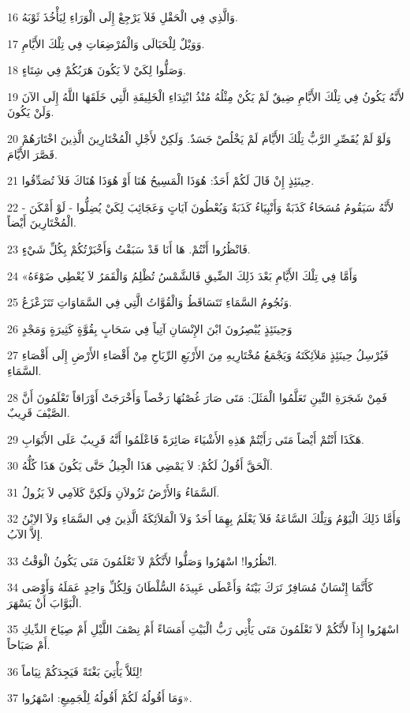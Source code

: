 \par 16 وَالَّذِي فِي الْحَقْلِ فَلاَ يَرْجِعْ إِلَى الْوَرَاءِ لِيَأْخُذَ ثَوْبَهُ.
\par 17 وَوَيْلٌ لِلْحَبَالَى وَالْمُرْضِعَاتِ فِي تِلْكَ الأَيَّامِ.
\par 18 وَصَلُّوا لِكَيْ لاَ يَكُونَ هَرَبُكُمْ فِي شِتَاءٍ.
\par 19 لأَنَّهُ يَكُونُ فِي تِلْكَ الأَيَّامِ ضِيقٌ لَمْ يَكُنْ مِثْلُهُ مُنْذُ ابْتِدَاءِ الْخَلِيقَةِ الَّتِي خَلَقَهَا اللَّهُ إِلَى الآنَ وَلَنْ يَكُونَ.
\par 20 وَلَوْ لَمْ يُقَصِّرِ الرَّبُّ تِلْكَ الأَيَّامَ لَمْ يَخْلُصْ جَسَدٌ. وَلَكِنْ لأَجْلِ الْمُخْتَارِينَ الَّذِينَ اخْتَارَهُمْ قَصَّرَ الأَيَّامَ.
\par 21 حِينَئِذٍ إِنْ قَالَ لَكُمْ أَحَدٌ: هُوَذَا الْمَسِيحُ هُنَا أَوْ هُوَذَا هُنَاكَ فَلاَ تُصَدِّقُوا.
\par 22 لأَنَّهُ سَيَقُومُ مُسَحَاءُ كَذَبَةٌ وَأَنْبِيَاءُ كَذَبَةٌ وَيُعْطُونَ آيَاتٍ وَعَجَائِبَ لِكَيْ يُضِلُّوا - لَوْ أَمْكَنَ - الْمُخْتَارِينَ أَيْضاً.
\par 23 فَانْظُرُوا أَنْتُمْ. هَا أَنَا قَدْ سَبَقْتُ وَأَخْبَرْتُكُمْ بِكُلِّ شَيْءٍ.
\par 24 «وَأَمَّا فِي تِلْكَ الأَيَّامِ بَعْدَ ذَلِكَ الضِّيقِ فَالشَّمْسُ تُظْلِمُ وَالْقَمَرُ لاَ يُعْطِي ضَوْءَهُ
\par 25 وَنُجُومُ السَّمَاءِ تَتَسَاقَطُ وَالْقُوَّاتُ الَّتِي فِي السَّمَاوَاتِ تَتَزَعْزَعُ.
\par 26 وَحِينَئِذٍ يُبْصِرُونَ ابْنَ الإِنْسَانِ آتِياً فِي سَحَابٍ بِقُوَّةٍ كَثِيرَةٍ وَمَجْدٍ
\par 27 فَيُرْسِلُ حِينَئِذٍ مَلاَئِكَتَهُ وَيَجْمَعُ مُخْتَارِيهِ مِنَ الأَرْبَعِ الرِّيَاحِ مِنْ أَقْصَاءِ الأَرْضِ إِلَى أَقْصَاءِ السَّمَاءِ.
\par 28 فَمِنْ شَجَرَةِ التِّينِ تَعَلَّمُوا الْمَثَلَ: مَتَى صَارَ غُصْنُهَا رَخْصاً وَأَخْرَجَتْ أَوْرَاقاً تَعْلَمُونَ أَنَّ الصَّيْفَ قَرِيبٌ.
\par 29 هَكَذَا أَنْتُمْ أَيْضاً مَتَى رَأَيْتُمْ هَذِهِ الأَشْيَاءَ صَائِرَةً فَاعْلَمُوا أَنَّهُ قَرِيبٌ عَلَى الأَبْوَابِ.
\par 30 اَلْحَقَّ أَقُولُ لَكُمْ: لاَ يَمْضِي هَذَا الْجِيلُ حَتَّى يَكُونَ هَذَا كُلُّهُ.
\par 31 اَلسَّمَاءُ وَالأَرْضُ تَزُولاَنِ وَلَكِنَّ كَلاَمِي لاَ يَزُولُ.
\par 32 وَأَمَّا ذَلِكَ الْيَوْمُ وَتِلْكَ السَّاعَةُ فَلاَ يَعْلَمُ بِهِمَا أَحَدٌ وَلاَ الْمَلاَئِكَةُ الَّذِينَ فِي السَّمَاءِ وَلاَ الاِبْنُ إلاَّ الآبُ.
\par 33 انْظُرُوا! اسْهَرُوا وَصَلُّوا لأَنَّكُمْ لاَ تَعْلَمُونَ مَتَى يَكُونُ الْوَقْتُ.
\par 34 كَأَنَّمَا إِنْسَانٌ مُسَافِرٌ تَرَكَ بَيْتَهُ وَأَعْطَى عَبِيدَهُ السُّلْطَانَ وَلِكُلِّ وَاحِدٍ عَمَلَهُ وَأَوْصَى الْبَوَّابَ أَنْ يَسْهَرَ.
\par 35 اسْهَرُوا إِذاً لأَنَّكُمْ لاَ تَعْلَمُونَ مَتَى يَأْتِي رَبُّ الْبَيْتِ أَمَسَاءً أَمْ نِصْفَ اللَّيْلِ أَمْ صِيَاحَ الدِّيكِ أَمْ صَبَاحاً.
\par 36 لِئَلاَّ يَأْتِيَ بَغْتَةً فَيَجِدَكُمْ نِيَاماً!
\par 37 وَمَا أَقُولُهُ لَكُمْ أَقُولُهُ لِلْجَمِيعِ: اسْهَرُوا».

